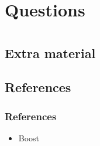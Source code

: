 \documentclass[aspectratio=169]{beamer}
\begin{document}
\section{Questions}

\begin{frame}
\end{frame}


\appendix

\section{\appendixname}
\frame{\tableofcontents}

\subsection{Extra material}

\subsection{References}

\begin{frame}[fragile]
  \frametitle{References}
  \begin{itemize}
  \item Boost
  \end{itemize}
\end{frame}
\end{document}
